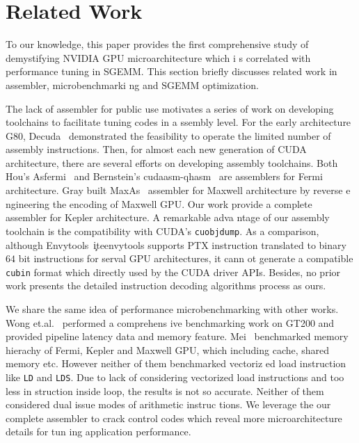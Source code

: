 \section{Related Work}
\label{sec:related}
To our knowledge, this paper provides the first comprehensive study of demystifying NVIDIA GPU microarchitecture which i
s correlated with performance tuning in SGEMM. This section briefly discusses related work in assembler, microbenchmarki
ng and SGEMM optimization.

The lack of assembler for public use motivates a series of work on developing toolchains to facilitate tuning codes in a
ssembly level. For the early architecture G80, Decuda~\cite{decuda} demonstrated the feasibility to operate the limited 
number of assembly instructions. Then, for almost each new generation of CUDA architecture, there are several efforts on
 developing assembly toolchains. Both Hou's Asfermi~\cite{asfermi} and Bernstein's cudaasm-qhasm~\cite{bernstein2012usab
le} are assemblers for Fermi architecture. Gray built MaxAs~\cite{maxas} assembler for Maxwell architecture by reverse e
ngineering the encoding of Maxwell GPU. Our work provide a complete assembler for Kepler architecture. A remarkable adva
ntage of our assembly toolchain is the compatibility with CUDA's {\tt cuobjdump}. As a comparison, although Envytools~\c
ite{envytools} supports PTX instruction translated to binary $64$ bit instructions for serval GPU architectures, it cann
ot generate a compatible {\tt cubin} format which directly used by the CUDA driver APIs. Besides, no prior work presents
 the detailed instruction decoding algorithms process as ours.

We share the same idea of performance microbenchmarking with other works. Wong et.al.~\cite{wong} performed a comprehens
ive benchmarking work on GT200 and provided pipeline latency data and
memory feature. Mei~\cite{mei} benchmarked memory hierachy
of Fermi, Kepler and Maxwell GPU, which including cache, shared memory etc. However neither of them benchmarked vectoriz
ed load instruction like {\tt LD} and {\tt LDS}. Due to lack of considering vectorized load instructions and too less in
struction inside loop, the results is not so accurate. Neither of them considered dual issue modes of arithmetic instruc
tions. We leverage the our complete assembler to crack control codes which reveal more microarchitecture details for tun
ing application performance.

